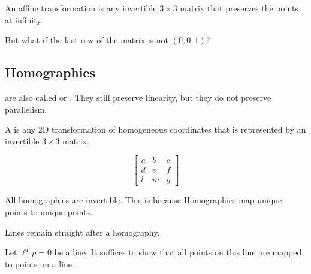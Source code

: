 \begin{definition}
    An affine transformation is any invertible $3 \times 3$ matrix that preserves the points at infinity.
\end{definition}

But what if the last row of the matrix is not $(0, 0, 1)$?

\subsection{Homographies}

 are also called  or . They still preserve linearity, but they do not preserve parallelism.

\begin{definition}
    A  is any 2D transformation of homogeneous coordinates that is represented by an invertible $3 \times 3$ matrix.

    \[
        \begin{bmatrix}
            a & b & c \\
            d & e & f \\
            l & m & g
        \end{bmatrix}
    \]
\end{definition}

All homographies are invertible. This is because Homographies map unique points to unique points. 


\begin{remark}
    Lines remain straight after a homography.

    Let $\ell^T p = 0$ be a line. It suffices to show that all points on this line are mapped to points on a line.

\end{remark}

